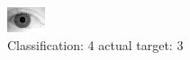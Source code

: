 \begin{figure}[h!]
\begin{center}
\includegraphics[width=0.60\columnwidth]{figures/ID2204_class_4_target_3.png}
\end{center}
\caption{ Classification: 4 actual target: 3}
\label{fig:ID2204_class_4_target_3}
\end{figure}
